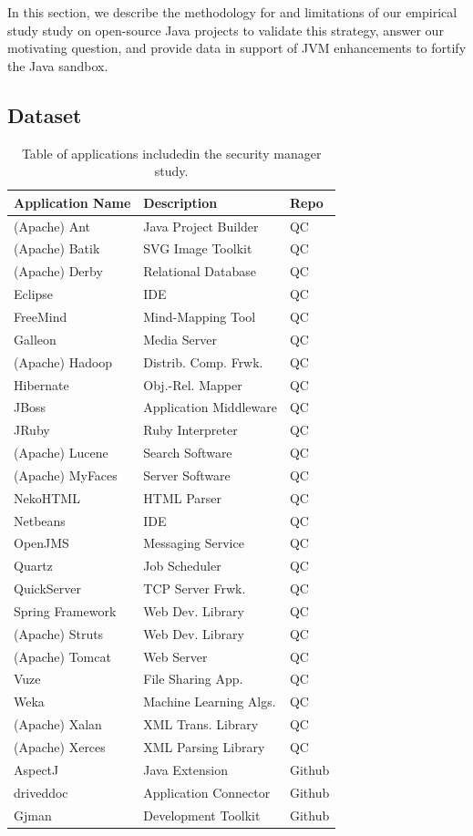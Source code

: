 \documentclass{sig-alternate}
\begin{document}
In this section, we describe the
methodology for and limitations of our empirical study
study on open-source Java projects to validate this strategy, answer our
motivating question, and provide data in support of JVM enhancements to fortify
the Java sandbox.  

\subsection{Dataset}\label{sec:Applications-Studied}

\begin{table}
\caption{Table of applications included\label{Table:applications-studied}
in the security manager study.}
\begin{tabular}{lll}
\toprule 
Application Name & Description & Repo\tabularnewline
\midrule
(Apache) Ant & Java Project Builder & QC\tabularnewline
(Apache) Batik & SVG Image Toolkit & QC\tabularnewline
(Apache) Derby & Relational Database & QC\tabularnewline
Eclipse  & IDE & QC\tabularnewline
FreeMind & Mind-Mapping Tool & QC\tabularnewline
Galleon & Media Server & QC\tabularnewline
(Apache) Hadoop & Distrib. Comp. Frwk. & QC\tabularnewline
Hibernate & Obj.-Rel. Mapper & QC\tabularnewline
JBoss & Application Middleware & QC\tabularnewline
JRuby & Ruby Interpreter & QC\tabularnewline
(Apache) Lucene & Search Software & QC\tabularnewline
(Apache) MyFaces & Server Software & QC\tabularnewline
NekoHTML & HTML Parser & QC\tabularnewline
Netbeans & IDE & QC\tabularnewline
OpenJMS & Messaging Service & QC\tabularnewline
Quartz  & Job Scheduler & QC\tabularnewline
QuickServer & TCP Server Frwk. & QC\tabularnewline
Spring Framework & Web Dev. Library & QC\tabularnewline
(Apache) Struts & Web Dev. Library & QC\tabularnewline
(Apache) Tomcat & Web Server & QC\tabularnewline
Vuze & File Sharing App. & QC\tabularnewline
Weka & Machine Learning Algs. & QC\tabularnewline
(Apache) Xalan & XML Trans. Library & QC\tabularnewline
(Apache) Xerces & XML Parsing Library & QC\tabularnewline
AspectJ & Java Extension & Github\tabularnewline
driveddoc & Application Connector & Github\tabularnewline
Gjman & Development Toolkit & Github\tabularnewline

\end{tabular}
\end{table}
\end{document}
